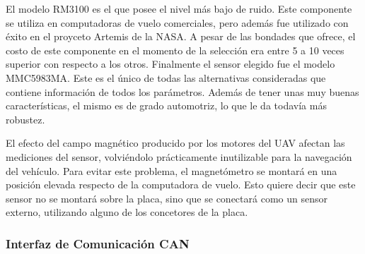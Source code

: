 El modelo RM3100 es el que posee el nivel más bajo de ruido. Este componente se utiliza en computadoras de vuelo comerciales, pero además fue utilizado con éxito en el proyceto Artemis de la NASA. A pesar de las bondades que ofrece, el costo de este componente en el momento de la selección era entre 5 a 10 veces superior con respecto a los otros. Finalmente el sensor elegido fue el modelo MMC5983MA. Este es el único de todas las alternativas consideradas que contiene información de todos los parámetros. Además de tener unas muy buenas características, el mismo es de grado automotriz, lo que le da todavía más robustez.

El efecto del campo magnético producido por los motores del UAV afectan las mediciones del sensor, volviéndolo prácticamente inutilizable para la navegación del vehículo. Para evitar este problema, el magnetómetro se montará en una posición elevada respecto de la computadora de vuelo. Esto quiere decir que este sensor no se montará sobre la placa, sino que se conectará como un sensor externo, utilizando alguno de los concetores de la placa.

\subsubsection{Interfaz de Comunicación CAN}



